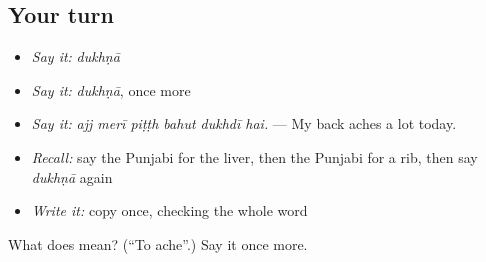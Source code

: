 \subsection*{Your turn}
\begin{itemize}
\raggedright
  \item \emph{Say it:} \emph{dukhṇā}
  \item \emph{Say it:} \emph{dukhṇā}, once more
  \item \emph{Say it:} \emph{ajj merī piṭṭh bahut dukhdī hai.} — My back aches a lot today.
  \item \emph{Recall:} say the Punjabi for the liver, then the Punjabi for a rib, then say \emph{dukhṇā} again
  \item \emph{Write it:} copy \textbf{} once, checking the whole word
\end{itemize}

\begin{tcolorbox}[breakable,colback=teal!4,colframe=teal!35!black,title={Before you move on}]
What does  mean? (\textquotedblleft{}To ache\textquotedblright{}.) Say it once more.
\end{tcolorbox}
